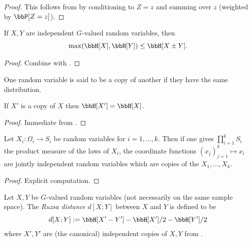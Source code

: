 \begin{proof} \leanok This follows from  by conditioning to $Z = z$ and summing over $z$ (weighted by $\bbP[Z=z]$).
\end{proof}

\begin{corollary}
  \label{sumset-lower}
  \leanok

  If $X,Y$ are independent $G$-valued random variables, then
  $$\max(\bbH[X], \bbH[Y]) \leq \bbH[X\pm Y]. $$
\end{corollary}
\begin{proof}
  \leanok

  Combine  with .
\end{proof}

One random variable is said to be a copy of another if they have the same distribution.

\begin{lemma}\label{copy-ent}
  \leanok
  If $X'$ is a copy of $X$ then $\bbH[X'] = \bbH[X]$.
\end{lemma}

\begin{proof}\leanok Immediate from .
\end{proof}

\begin{lemma}\label{independent-exist}
   \leanok
  Let $X_i : \Omega_i \to S_i$ be random variables for $i=1,\dots,k$.  Then if one gives $\prod_{i=1}^k S_i$ the product measure of the laws of $X_i$, the coordinate functions $(x_j)_{j=1}^k \mapsto x_i$ are jointly independent random variables which are copies of the $X_1,\dots,X_k$.
\end{lemma}

\begin{proof} \leanok
  Explicit computation.
\end{proof}

\begin{definition}\label{ruz-dist-def}
  \leanok
  Let $X,Y$ be $G$-valued random variables (not necessarily on the same sample space).  The \emph{Ruzsa distance} $d[X ;Y]$ between $X$ and $Y$ is defined to be
$$ d[X ;Y] := \bbH[X' - Y'] - \bbH[X']/2 - \bbH[Y']/2$$
where $X',Y'$ are (the canonical) independent copies of $X,Y$ from .
\end{definition}


